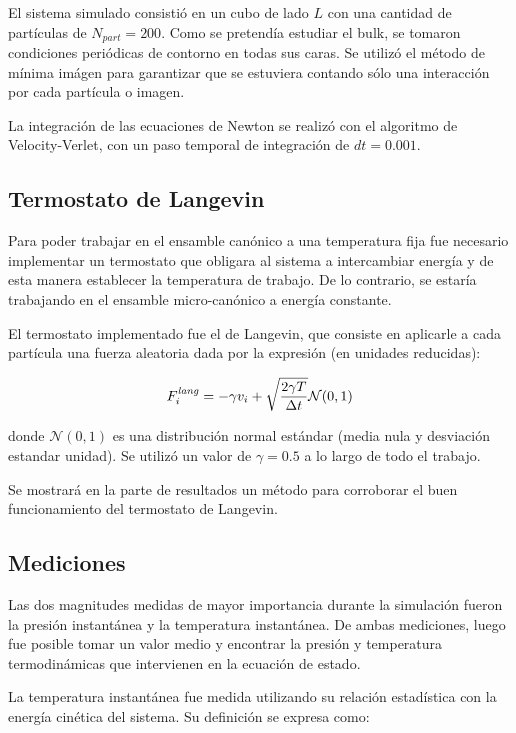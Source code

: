 \documentclass[a4paper,12pt]{article}
\begin{document}
El sistema simulado consistió en un cubo de lado $L$ con una cantidad de 
partículas de $N_{part}=200$. Como se pretendía estudiar el bulk, se tomaron 
condiciones periódicas de contorno en todas sus caras. Se utilizó el método de 
mínima imágen para garantizar que se estuviera contando sólo una interacción 
por cada partícula o imagen. 

La integración de las ecuaciones de Newton se realizó con el algoritmo de 
Velocity-Verlet, con un paso temporal de integración de $dt=0.001$.

\subsection{Termostato de Langevin}

Para poder trabajar en el ensamble canónico a una temperatura fija fue 
necesario implementar un termostato que obligara al sistema a intercambiar 
energía y de esta manera establecer la temperatura de trabajo. De lo contrario, 
se estaría trabajando en el ensamble micro-canónico a energía constante.

El termostato implementado fue el de Langevin, que consiste en aplicarle a cada 
partícula una fuerza aleatoria dada por la expresión (en unidades reducidas):

\begin{equation}\label{eq:termo}
 F_i^{\it lang} = - \gamma  v_i + \sqrt{\frac{2\gamma T}{\Delta t}} \mathcal 
 N(0,1)
\end{equation}

\noindent donde $\mathcal N(0,1)$ es una distribución normal estándar (media 
nula y desviación estandar unidad). Se utilizó un valor de $\gamma=0.5$ a lo 
largo de todo el trabajo.

Se mostrará en la parte de resultados un método para corroborar el buen 
funcionamiento del termostato de Langevin.

\subsection{Mediciones}

Las dos magnitudes medidas de mayor importancia durante la simulación fueron la 
presión instantánea y la temperatura instantánea. De ambas mediciones, luego 
fue posible tomar un valor medio y encontrar la presión y temperatura 
termodinámicas que intervienen en la ecuación de estado.

La temperatura instantánea fue medida utilizando su relación estadística con la 
energía cinética del sistema. Su definición se expresa como:
\end{document}
